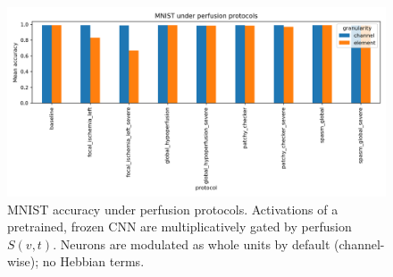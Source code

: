 \begin{figure}[t]
  \centering
  \includegraphics[width=\linewidth]{results/summary_bars.png}
  \caption{MNIST accuracy under perfusion protocols. Activations of a pretrained, frozen CNN are multiplicatively gated by perfusion $S(v,t)$. Neurons are modulated as whole units by default (channel-wise); no Hebbian terms.}
  \label{fig:mnist-perfusion-bars}
\end{figure}


